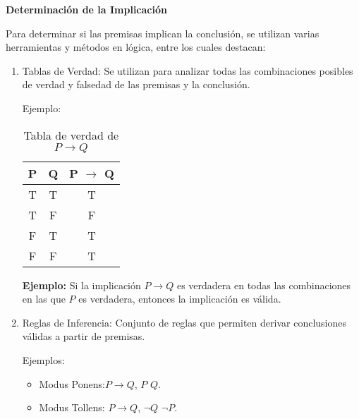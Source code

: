 \textbf{Determinación de la Implicación}

Para determinar si las premisas implican la conclusión, se utilizan varias herramientas y métodos en lógica, entre los cuales destacan:

\begin{enumerate}
   \item Tablas de Verdad: Se utilizan para analizar todas las combinaciones posibles de verdad y falsedad de las premisas y la conclusión.
         
         Ejemplo:
         
         \begin{table}[ht]
            \centering
            \caption{Tabla de verdad de \( P \rightarrow Q \)}
            \begin{tabular}{|c|c|c|}
               \hline
               \textbf{P} & \textbf{Q} & \textbf{P $\rightarrow$ Q} \\
               \hline
               T          & T          & T                          \\
               \hline
               T          & F          & F                          \\
               \hline
               F          & T          & T                          \\
               \hline
               F          & F          & T                          \\
               \hline
            \end{tabular}
            \label{tab:truth-table}
         \end{table}
         
         \bigskip
         
         \textbf{Ejemplo:} Si la implicación \( P \rightarrow Q \) es verdadera en todas las combinaciones en las que \( P \) es verdadera, entonces la implicación es válida.
         
   \item Reglas de Inferencia: Conjunto de reglas que permiten derivar conclusiones válidas a partir de premisas.
         
         Ejemplos:
         
         \begin{itemize}
            \item Modus Ponens:\( P \rightarrow Q \), \( P \)  \( Q \).
            \item Modus Tollens: \( P \rightarrow Q \), \( \neg Q \)  \( \neg P \).
         \end{itemize}
         

\end{enumerate}
